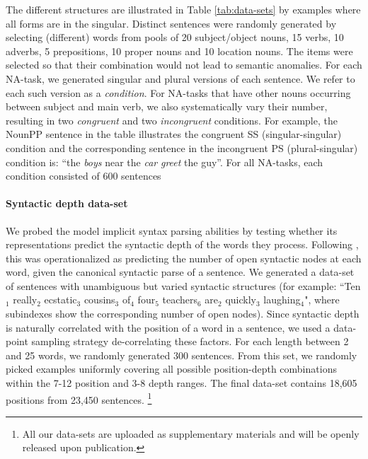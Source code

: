 The different structures are illustrated in Table \ref{tab:data-sets}
by examples where all forms are in the singular. Distinct sentences
were randomly generated by selecting (different) words from pools of
20 subject/object nouns, 15 verbs, 10 adverbs, 5 prepositions, 10
proper nouns and 10 location nouns. The items were selected so that
their combination would not lead to semantic anomalies. For each
NA-task, we generated singular and plural versions of each
sentence. We refer to each such version as a \textit{condition}. For
NA-tasks that have other nouns occurring between subject and main
verb, we also systematically vary their number, resulting in two
\textit{congruent} and two \textit{incongruent} conditions. For example, the NounPP
sentence in the table illustrates the congruent SS (singular-singular)
condition and the corresponding sentence in the incongruent PS (plural-singular)
condition is: ``the \emph{boys} near the \emph{car} \emph{greet} the guy''. For all
NA-tasks, each condition consisted of 600 sentences

\paragraph{Syntactic depth data-set} We probed the model implicit
syntax parsing abilities by testing whether its representations
predict the syntactic depth of the words they process. Following
, this was operationalized as predicting the
number of open syntactic nodes at each word, given the canonical
syntactic parse of a sentence.  We generated a data-set of sentences with
unambiguous but varied syntactic structures (for example:
``Ten$_1$ really$_2$ ecstatic$_3$ cousins$_3$ of$_4$ four$_5$ teachers$_6$
are$_2$ quickly$_3$ laughing$_4$", where subindexes show the corresponding
number of open nodes).
Since syntactic depth is
naturally correlated with the position of a word in a sentence, we
used a data-point sampling strategy de-correlating these factors. For
each length between 2 and 25 words, we randomly generated 300
sentences. From this set, we randomly picked examples uniformly
covering all possible position-depth combinations within the 7-12
position and 3-8 depth ranges. The final data-set contains 18,605
positions from 23,450 sentences. \footnote{All our data-sets are
  uploaded as supplementary materials and will be openly released upon
  publication.}